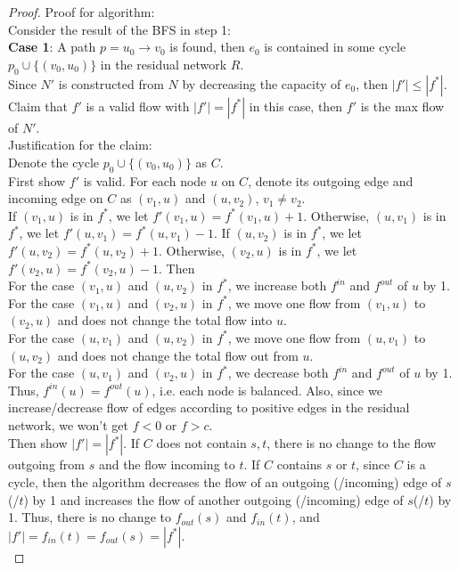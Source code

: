 \documentclass[11pt]{article}
\begin{document}
\begin{enumerate}
\begin{enumerate}
\begin{proof}
    Proof for algorithm:\\
    Consider the result of the BFS in step 1:\\
    \textbf{Case 1}: A path $p = u_0 \rightarrow v_0$ is found, then $e_0$ is contained in some cycle $p_0 \cup \{(v_0, u_0)\}$ in the residual network $R$. \\
    Since $N'$ is constructed from $N$ by decreasing the capacity of $e_0$, then $|f'| \leq |f^*|$.\\
    Claim that $f'$ is a valid flow with $|f'| = |f^*|$ in this case, then $f'$ is the max flow of $N'$.\\[2ex]
    Justification for the claim: \\
    Denote the cycle $p_0 \cup \{(v_0, u_0)\}$ as $C$.\\
    First show $f'$ is valid. For each node $u$ on $C$, denote its outgoing edge and incoming edge on $C$ as $(v_1, u)$ and $(u, v_2)$, $v_1 \neq v_2$.\\
    If $(v_1, u)$ is in $f^*$, we let $f'(v_1, u) = f^*(v_1, u) + 1$. Otherwise, $(u, v_1)$ is in $f^*$, we let $f'(u, v_1) = f^*(u, v_1) - 1$. If $(u, v_2)$ is in $f^*$, we let $f'(u, v_2) = f^*(u, v_2) + 1$. Otherwise, $(v_2, u)$ is in $f^*$, we let $f'(v_2, u) = f^*(v_2, u) - 1$. Then\\
    For the case $(v_1, u)$ and $(u, v_2)$ in $f^*$, we increase both $f^{in}$ and $f^{out}$ of $u$ by 1.\\
    For the case $(v_1, u)$ and $(v_2, u)$ in $f^*$, we move one flow from $(v_1, u)$ to $(v_2, u)$ and does not change the total flow into $u$.\\
    For the case $(u, v_1)$ and $(u, v_2)$ in $f^*$, we move one flow from $(u, v_1)$ to $(u, v_2)$ and does not change the total flow out from $u$.\\
    For the case $(u, v_1)$ and $(v_2, u)$ in $f^*$, we decrease both $f^{in}$ and $f^{out}$ of $u$ by 1.\\
    Thus, $f^{in}(u) = f^{out}(u)$, i.e. each node is balanced. Also, since we increase/decrease flow of edges according to positive edges in the residual network, we won't get $f < 0$ or $f > c$. \\
    Then show $|f'| = |f^*|$. If $C$ does not contain $s, t$, there is no change to the flow outgoing from $s$ and the flow incoming to $t$. If $C$ contains $s$ or $t$, since $C$ is a cycle, then the algorithm decreases the flow of an outgoing (/incoming) edge of $s$(/$t$) by 1 and increases the flow of another outgoing (/incoming) edge of $s$(/$t$) by 1. Thus, there is no change to  $f_{out}(s)$ and $f_{in}(t)$, and $|f'| = f_{in}(t) = f_{out}(s) = |f^*|$. \\[2ex]
    

\end{proof}
\end{enumerate}
\end{enumerate}
\end{document}
